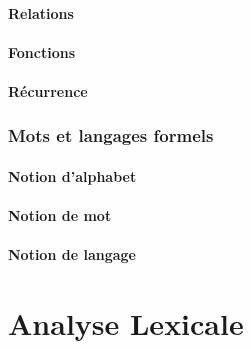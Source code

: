 \subsection{Relations}






 
\subsection{Fonctions}


 
\subsection{Récurrence}


 
\section{Mots et langages formels}
 
\subsection{Notion d'alphabet}

 
\subsection{Notion de mot}






 
\subsection{Notion de langage}



 
 
\part{Analyse Lexicale}
 
